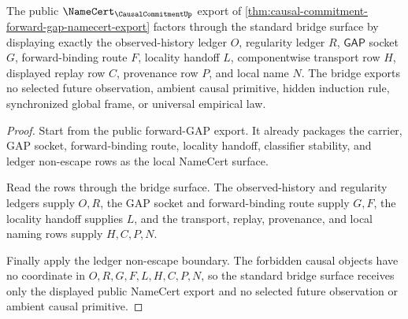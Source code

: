 \begin{theorem}
\label{thm:causal-commitment-standard-bridge-surface}
The public $\NameCert_{\CausalCommitmentUp}$ export of
\autoref{thm:causal-commitment-forward-gap-namecert-export} factors through the
standard bridge surface by displaying exactly the observed-history ledger $O$,
regularity ledger $R$, $\mathsf{GAP}$ socket $G$, forward-binding route $F$,
locality handoff $L$, componentwise transport row $H$, displayed replay row
$C$, provenance row $P$, and local name $N$. The bridge exports no selected
future observation, ambient causal primitive, hidden induction rule,
synchronized global frame, or universal empirical law.
\end{theorem}
\begin{proof}
Start from the public forward-GAP export. It already packages the carrier, GAP
socket, forward-binding route, locality handoff, classifier stability, and
ledger non-escape rows as the local NameCert surface.

Read the rows through the bridge surface. The observed-history and regularity
ledgers supply $O,R$, the GAP socket and forward-binding route supply $G,F$,
the locality handoff supplies $L$, and the transport, replay, provenance, and
local naming rows supply $H,C,P,N$.

Finally apply the ledger non-escape boundary. The forbidden causal objects have
no coordinate in $O,R,G,F,L,H,C,P,N$, so the standard bridge surface receives
only the displayed public NameCert export and no selected future observation or
ambient causal primitive.
\end{proof}


\begin{closurestatus}{\CausalCommitmentUp}
  \theoryclosure{\matureClosure}
  \formalstatus{\unformalizedV}
\end{closurestatus}
